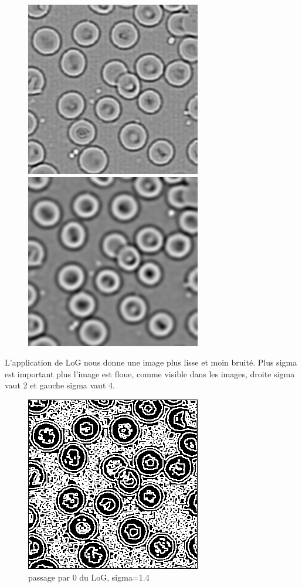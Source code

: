 \documentclass[a4paper,12pt]{report}
\begin{document}
\begin{figure}[!ht]
	\center	
	\includegraphics[scale=0.5]{image/laplacian_sigma2.png}
	\includegraphics[scale=0.5]{image/laplacian_sigma4.png}
\end{figure}

L'application de LoG nous donne une image plus lisse et moin bruité. Plus sigma est important plus l'image est floue, comme visible dans les images, droite sigma vaut 2 et gauche sigma vaut 4.

\begin{figure}[!ht]
	\center	
	\includegraphics[scale=0.5]{image/laplacian_14.png}
	\caption{passage par 0 du LoG, sigma=1.4}
\end{figure}
\end{document}

